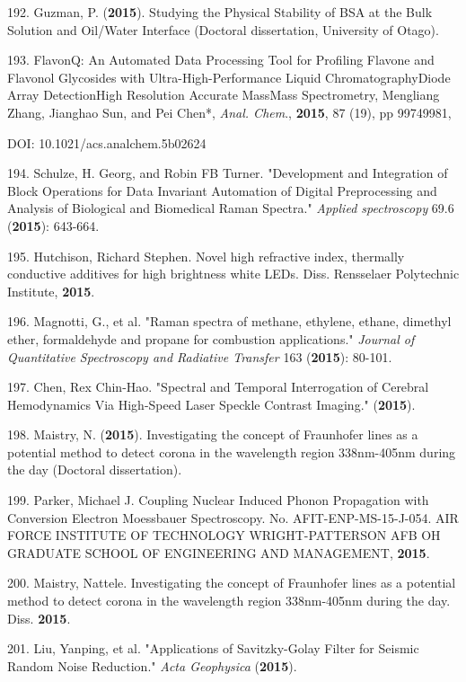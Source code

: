 192. Guzman, P. (\textbf{2015}). Studying the Physical Stability of BSA at the Bulk Solution and Oil/Water Interface (Doctoral dissertation, University of Otago).

193. FlavonQ: An Automated Data Processing Tool for Profiling Flavone and Flavonol Glycosides with Ultra-High-Performance Liquid Chromatography\textendash{}Diode Array Detection\textendash{}High Resolution Accurate Mass\textendash{}Mass Spectrometry, Mengliang Zhang, Jianghao Sun, and Pei Chen*, \textit{Anal. Chem}., \textbf{2015}, 87 (19), pp 9974\textendash{}9981,

DOI: 10.1021/acs.analchem.5b02624

194. Schulze, H. Georg, and Robin FB Turner. "Development and Integration of Block Operations for Data Invariant Automation of Digital Preprocessing and Analysis of Biological and Biomedical Raman Spectra." \textit{Applied spectroscopy} 69.6 (\textbf{2015}): 643-664.

195. Hutchison, Richard Stephen. Novel high refractive index, thermally conductive additives for high brightness white LEDs. Diss. Rensselaer Polytechnic Institute, \textbf{2015}.

196. Magnotti, G., et al. "Raman spectra of methane, ethylene, ethane, dimethyl ether, formaldehyde and propane for combustion applications." \textit{Journal of Quantitative Spectroscopy and Radiative Transfer} 163 (\textbf{2015}): 80-101.

197. Chen, Rex Chin-Hao. "Spectral and Temporal Interrogation of Cerebral Hemodynamics Via High-Speed Laser Speckle Contrast Imaging." (\textbf{2015}).

198. Maistry, N. (\textbf{2015}). Investigating the concept of Fraunhofer lines as a potential method to detect corona in the wavelength region 338nm-405nm during the day (Doctoral dissertation).

199. Parker, Michael J. Coupling Nuclear Induced Phonon Propagation with Conversion Electron Moessbauer Spectroscopy. No. AFIT-ENP-MS-15-J-054. AIR FORCE INSTITUTE OF TECHNOLOGY WRIGHT-PATTERSON AFB OH GRADUATE SCHOOL OF ENGINEERING AND MANAGEMENT, \textbf{2015}.

200. Maistry, Nattele. Investigating the concept of Fraunhofer lines as a potential method to detect corona in the wavelength region 338nm-405nm during the day. Diss. \textbf{2015}.

201. Liu, Yanping, et al. "Applications of Savitzky-Golay Filter for Seismic Random Noise Reduction." \textit{Acta Geophysica} (\textbf{2015}).

